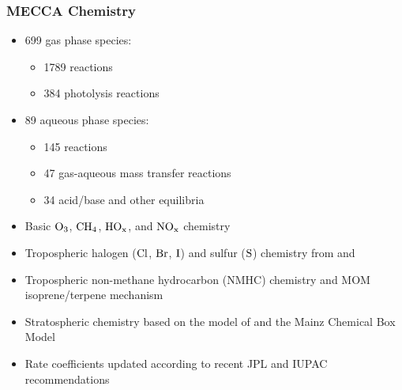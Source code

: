 \documentclass[t]{beamer}
\DeclareRobustCommand*{\chem}[1]{\ensuremath{%
\mathcode`-="0200\mathcode`\=="003D%
\mathrm{#1}}}
\begin{document}
\begin{frame}

  \frametitle{MECCA Chemistry}

  \begin{itemize}
  \item 699 gas phase species:
    \begin{itemize}
    \item 1789 reactions
    \item 384 photolysis reactions
    \end{itemize}
  \item 89 aqueous phase species:
    \begin{itemize}
    \item 145 reactions
    \item 47 gas-aqueous mass transfer reactions
    \item 34 acid/base and other equilibria
    \end{itemize}
  \item Basic \chem{O_3}, \chem{CH_4}, \chem{HO_x}, and \chem{NO_x}
    chemistry
  \item Tropospheric halogen (\chem{Cl}, \chem{Br}, \chem{I}) and sulfur
    (\chem{S}) chemistry from \citet{271} and \citet{1456}
  \item Tropospheric non-methane hydrocarbon (NMHC) chemistry and MOM
    isoprene/terpene mechanism \citep{2272}
  \item Stratospheric chemistry based on the model of \citet{1402} and
    the Mainz Chemical Box Model \citep{1608}
  \item Rate coefficients updated according to recent JPL and IUPAC
    recommendations
  \end{itemize}

\end{frame}

\end{document}
